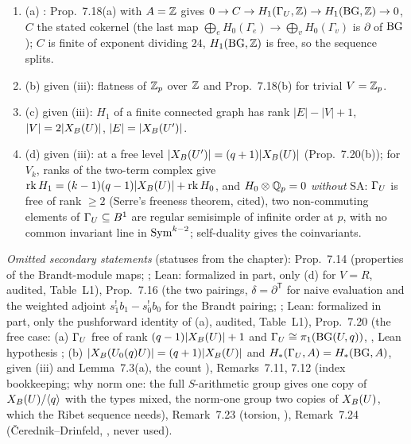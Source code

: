 \begin{outline}
\begin{enumerate}
\item (a) \stpmc: Prop.~7.18(a) with $A=\mathbb{Z}$ gives $0\to C\to H_1(\Gamma_U,\mathbb{Z})\to H_1(\mathrm{BG},\mathbb{Z})\to0$, $C$ the stated cokernel (the last map
$\bigoplus_eH_0(\Gamma_e)\to\bigoplus_vH_0(\Gamma_v)$ is $\partial$ of $\mathrm{BG}$); $C$ is finite of exponent dividing $24$, $H_1(\mathrm{BG},\mathbb{Z})$ is free, so the
sequence splits.
\item (b) \stpmc{} given (iii): flatness of $\mathbb{Z}_p$ over $\mathbb{Z}$ and Prop.~7.18(b) for trivial $V=\mathbb{Z}_p$.
\item (c) \stproved{} given (iii): $H_1$ of a finite connected graph has rank $|E|-|V|+1$, $|V|=2|X_B(U)|$, $|E|=|X_B(U')|$.
\item (d) \stpmc{} given (iii): at a free level $|X_B(U')|=(q+1)|X_B(U)|$ (Prop.~7.20(b)); for $V_k$, ranks of the two-term complex give
$\operatorname{rk} H_1=(k-1)(q-1)|X_B(U)|+\operatorname{rk} H_0$, and $H_0\otimes\mathbb{Q}_p=0$ \emph{without} SA: $\Gamma_U$ is free of rank $\ge2$ (Serre's freeness theorem, cited),
two non-commuting elements of $\Gamma_U\subseteq B^1$ are regular semisimple of infinite order at $p$, with no common invariant line in
$\mathrm{Sym}^{k-2}$; self-duality gives the coinvariants.
\end{enumerate}
\end{outline}

\noindent\emph{Omitted secondary statements} (statuses from the chapter): Prop.~7.14 (properties of the Brandt-module maps;
\stproved; Lean: formalized in part, only (d) for $V=R$, audited, Table~L1), Prop.~7.16 (the two pairings, $\delta=\partial^{\mathsf T}$ for naive evaluation and the
weighted adjoint $s_1^!b_1-s_0^!b_0$ for the Brandt pairing; \stproved; Lean: formalized in part, only the pushforward identity of (a), audited, Table~L1), Prop.~7.20 (the free case: (a) $\Gamma_U$ free
of rank $(q-1)|X_B(U)|+1$ and $\Gamma_U\cong\pi_1(\mathrm{BG}(U,q))$, \stpmc{} \cite[I.3.3, Thm.~4 and 4$'$, p.~27; II.1.5, Thm.~4, p.~82]{Se}, Lean
hypothesis ; (b) $|X_B(U_0(q)U)|=(q+1)|X_B(U)|$ and $H_*(\Gamma_U,A)=H_*(\mathrm{BG},A)$, \stproved{} given (iii) and
Lemma~7.3(a), the count \stformal{} ), Remarks~7.11, 7.12 (index bookkeeping;
why norm one: the full $S$-arithmetic group gives one copy of $X_B(U)/\langle q\rangle$ with the types mixed, the norm-one group
two copies of $X_B(U)$, which the Ribet sequence needs), Remark~7.23 (torsion, \stcomp), Remark~7.24 (\v{C}erednik--Drinfeld,
\stcited{} \cite{BC}, never used).

